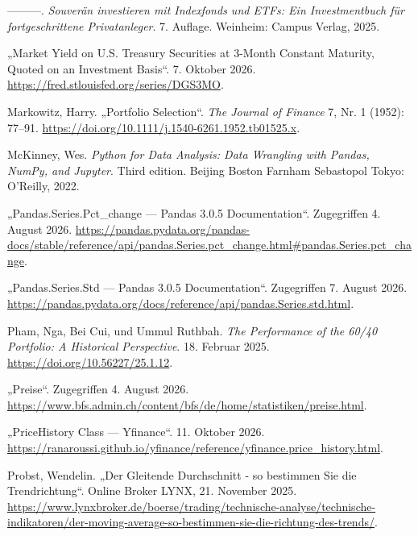 \documentclass[
  ngerman,
  a4paper,
  DIV=11,
  oneside]{scrreprt}
\newlength{\cslhangindent}
\newenvironment{CSLReferences}[2] %
 {\begin{list}{}{%
  \setlength{\itemindent}{0pt}
  \setlength{\leftmargin}{0pt}
  \setlength{\parsep}{0pt}
  \ifodd #1
   \setlength{\leftmargin}{\cslhangindent}
   \setlength{\itemindent}{-1\cslhangindent}
  \fi
  \setlength{\itemsep}{#2\baselineskip}}}
 {\end{list}}
\begin{document}
\begin{CSLReferences}{1}{1}
---------. \emph{Souverän investieren mit Indexfonds und ETFs: Ein
Investmentbuch für fortgeschrittene Privatanleger}. 7. Auflage.
Weinheim: Campus Verlag, 2025.

{„Market {Yield} on {U}.{S}. {Treasury Securities} at 3-{Month Constant
Maturity}, {Quoted} on an {Investment Basis}``}. 7. Oktober 2026.
\url{https://fred.stlouisfed.org/series/DGS3MO}.

Markowitz, Harry. {„Portfolio {Selection}``}. \emph{The Journal of
Finance} 7, Nr. 1 (1952): 77--91.
\url{https://doi.org/10.1111/j.1540-6261.1952.tb01525.x}.

McKinney, Wes. \emph{Python for Data Analysis: Data Wrangling with
Pandas, {NumPy}, and {Jupyter}}. Third edition. Beijing Boston Farnham
Sebastopol Tokyo: O'Reilly, 2022.

{„Pandas.{Series}.Pct\_change --- Pandas 3.0.5 Documentation``}.
Zugegriffen 4. August 2026.
\url{https://pandas.pydata.org/pandas-docs/stable/reference/api/pandas.Series.pct_change.html\#pandas.Series.pct_change}.

{„Pandas.{Series}.Std --- Pandas 3.0.5 Documentation``}. Zugegriffen 7.
August 2026.
\url{https://pandas.pydata.org/docs/reference/api/pandas.Series.std.html}.

Pham, Nga, Bei Cui, und Ummul Ruthbah. \emph{The {Performance} of the
60/40 {Portfolio}: {A Historical Perspective}}. 18. Februar 2025.
\url{https://doi.org/10.56227/25.1.12}.

{„Preise``}. Zugegriffen 4. August 2026.
\url{https://www.bfs.admin.ch/content/bfs/de/home/statistiken/preise.html}.

{„{PriceHistory} Class --- Yfinance``}. 11. Oktober 2026.
\url{https://ranaroussi.github.io/yfinance/reference/yfinance.price_history.html}.

Probst, Wendelin. {„Der Gleitende Durchschnitt - so bestimmen Sie die
Trendrichtung``}. Online Broker LYNX, 21. November 2025.
\url{https://www.lynxbroker.de/boerse/trading/technische-analyse/technische-indikatoren/der-moving-average-so-bestimmen-sie-die-richtung-des-trends/}.


\end{CSLReferences}
\end{document}
